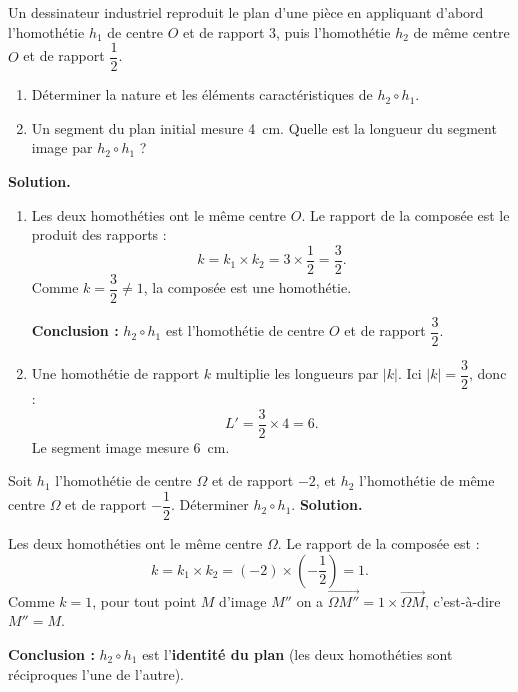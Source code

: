\documentclass[11pt]{article}
\begin{document}
\begin{exoresolu}
Un dessinateur industriel reproduit le plan d'une pièce en appliquant d'abord l'homothétie $h_1$ de centre $O$ et de rapport $3$, puis l'homothétie $h_2$ de même centre $O$ et de rapport $\dfrac{1}{2}$.
\begin{enumerate}
\item Déterminer la nature et les éléments caractéristiques de $h_2 \circ h_1$.
\item Un segment du plan initial mesure \SI{4}{cm}. Quelle est la longueur du segment image par $h_2 \circ h_1$ ?
\end{enumerate}
\tcblower
\textbf{Solution.}
\begin{enumerate}
\item Les deux homothéties ont le même centre $O$. Le rapport de la composée est le produit des rapports :
\[ k = k_1 \times k_2 = 3 \times \frac{1}{2} = \frac{3}{2}. \]
Comme $k = \dfrac{3}{2} \neq 1$, la composée est une homothétie.

\textbf{Conclusion :} $h_2 \circ h_1$ est l'homothétie de centre $O$ et de rapport $\dfrac{3}{2}$.

\item Une homothétie de rapport $k$ multiplie les longueurs par $|k|$. Ici $|k| = \dfrac{3}{2}$, donc :
\[ L' = \frac{3}{2} \times 4 = 6. \]
Le segment image mesure \SI{6}{cm}.
\end{enumerate}
\end{exoresolu}

\begin{exoresolu}
Soit $h_1$ l'homothétie de centre $\Omega$ et de rapport $-2$, et $h_2$ l'homothétie de même centre $\Omega$ et de rapport $-\dfrac{1}{2}$. Déterminer $h_2 \circ h_1$.
\tcblower
\textbf{Solution.}

Les deux homothéties ont le même centre $\Omega$. Le rapport de la composée est :
\[ k = k_1 \times k_2 = (-2) \times \left(-\frac{1}{2}\right) = 1. \]
Comme $k = 1$, pour tout point $M$ d'image $M''$ on a $\overrightarrow{\Omega M''} = 1 \times \overrightarrow{\Omega M}$, c'est-à-dire $M'' = M$.

\textbf{Conclusion :} $h_2 \circ h_1$ est l'\textbf{identité du plan} (les deux homothéties sont réciproques l'une de l'autre).
\end{exoresolu}
\end{document}
